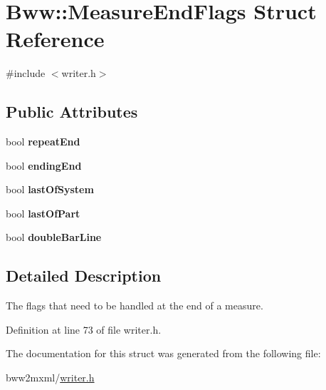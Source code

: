 \hypertarget{struct_bww_1_1_measure_end_flags}{}\section{Bww\+:\+:Measure\+End\+Flags Struct Reference}
\label{struct_bww_1_1_measure_end_flags}


{\ttfamily \#include $<$writer.\+h$>$}

\subsection*{Public Attributes}
\begin{DoxyCompactItemize}
\item 
\mbox{\label{struct_bww_1_1_measure_end_flags_adf8075eca3b42c91113c1db8fba471d0}} 
bool {\bfseries repeat\+End}
\item 
\mbox{\label{struct_bww_1_1_measure_end_flags_a89c8b07fe6bfb54c222a07da45ce0d1f}} 
bool {\bfseries ending\+End}
\item 
\mbox{\label{struct_bww_1_1_measure_end_flags_a8c31a4859cb164957356a33233634d27}} 
bool {\bfseries last\+Of\+System}
\item 
\mbox{\label{struct_bww_1_1_measure_end_flags_a7b6571f0eaa23c6e2ed66d6fd6d3e4f0}} 
bool {\bfseries last\+Of\+Part}
\item 
\mbox{\label{struct_bww_1_1_measure_end_flags_a900874337e3599c7e1ebff5e96f3b439}} 
bool {\bfseries double\+Bar\+Line}
\end{DoxyCompactItemize}


\subsection{Detailed Description}
The flags that need to be handled at the end of a measure. 

Definition at line 73 of file writer.\+h.



The documentation for this struct was generated from the following file\+:\begin{DoxyCompactItemize}
\item 
bww2mxml/\hyperlink{writer_8h}{writer.\+h}\end{DoxyCompactItemize}
